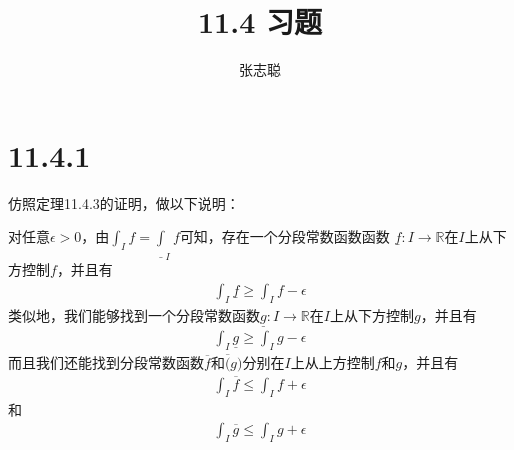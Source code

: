 \documentclass{article}
\begin{document}
\title{11.4 习题}
\author{张志聪}
\maketitle

\section*{11.4.1}

仿照定理11.4.3的证明，做以下说明：

对任意$\epsilon > 0$，由$\int_I f = \underline{\int}_I f$可知，存在一个分段常数函数函数
$\underline{f} : I \to \mathbb{R}$在$I$上从下方控制$f$，并且有
\begin{align*}
  \int_I \underline{f} \geq \int_I f - \epsilon
\end{align*}
类似地，我们能够找到一个分段常数函数$\underline{g}: I \to \mathbb{R}$在$I$上从下方控制$g$，并且有
\begin{align*}
  \int_I \underline{g} \geq \int_I g - \epsilon
\end{align*}
而且我们还能找到分段常数函数$\overline{f}$和$\overline(g)$分别在$I$上从上方控制$f$和$g$，并且有
\begin{align*}
  \int_I \overline{f} \leq \int_I f + \epsilon
\end{align*}
和
\begin{align*}
  \int_I \overline{g} \leq \int_I g + \epsilon
\end{align*}
\end{document}
